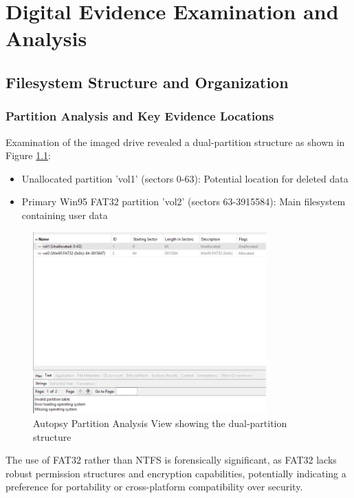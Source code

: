 \chapter{Digital Evidence Examination and Analysis}

\section{Filesystem Structure and Organization}

\subsection{Partition Analysis and Key Evidence Locations}
Examination of the imaged drive revealed a dual-partition structure as shown in Figure \ref{fig:partition_structure}:

\begin{itemize}
    \item Unallocated partition 'vol1' (sectors 0-63): Potential location for deleted data
    \item Primary Win95 FAT32 partition 'vol2' (sectors 63-3915584): Main filesystem containing user data
\end{itemize}

\begin{figure}[htbp]
    \centering
    \includegraphics[width=0.8\textwidth]{images/Evidence Examination/Image1.png}
    \caption{Autopsy Partition Analysis View showing the dual-partition structure}
    \label{fig:partition_structure}
\end{figure}

The use of FAT32 rather than NTFS is forensically significant, as FAT32 lacks robust permission structures and encryption capabilities, potentially indicating a preference for portability or cross-platform compatibility over security.

